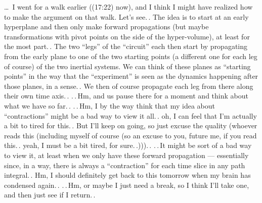 \documentclass{report}
\begin{document}
\ldots\ I went for a walk earlier ((17:22) now), and I think I might have realized how to make the argument on that walk. Let's see.\,. The idea is to start at an early hyperplane and then only make forward propagations (but maybe transformations with pivot points on the side of the hyper-volume), at least for the most part.\,. The two ``legs'' of the ``circuit'' each then start by propagating from the early plane to one of the two starting points (a different one for each leg of course) of the two inertial systems. We can think of these planes as ``starting points'' in the way that the ``experiment'' is seen as the dynamics happening after those planes, in a sense.\,. We then of course propagate each leg from there along their own time axis.\,. .\,.\,Hm, and us pause there for a moment and think about what we have so far.\,. .\,.\,Hm, I by the way think that my idea about ``contractions'' might be a bad way to view it all.\,. oh, I can feel that I'm actually a bit to tired for this.\,. But I'll keep on going, so just excuse the quality (whoever reads this (including myself of course (so an excuse to you, future me, if you read this.\,. yeah, I must be a bit tired, for sure.\,.))).\,. .\,.\,It might be sort of a bad way to view it, at least when we only have these forward propagation --- essentially since, in a way, there is always a ``contraction'' for each time slice in any path integral.\,. Hm, I should definitely get back to this tomorrow when my brain has condensed again.\,. .\,.\,Hm, or maybe I just need a break, so I think I'll take one, and then just see if I return.\,. %
\end{document}

